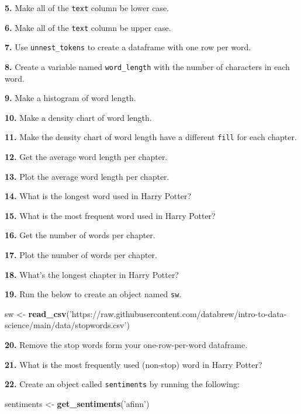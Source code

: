 \documentclass[]{book}
\newenvironment{Shaded}{\begin{snugshade}}{\end{snugshade}}
\newcommand{\KeywordTok}[1]{\textcolor[rgb]{0.13,0.29,0.53}{\textbf{#1}}}
\newcommand{\NormalTok}[1]{#1}
\newcommand{\StringTok}[1]{\textcolor[rgb]{0.31,0.60,0.02}{#1}}
\begin{document}
\textbf{5.} Make all of the \texttt{text} column be lower case.

\textbf{6.} Make all of the \texttt{text} column be upper case.

\textbf{7.} Use \texttt{unnest\_tokens} to create a dataframe with one row per word.

\textbf{8.} Create a variable named \texttt{word\_length} with the number of characters in each word.

\textbf{9.} Make a histogram of word length.

\textbf{10.} Make a density chart of word length.

\textbf{11.} Make the density chart of word length have a different \texttt{fill} for each chapter.

\textbf{12.} Get the average word length per chapter.

\textbf{13.} Plot the average word length per chapter.

\textbf{14.} What is the longest word used in Harry Potter?

\textbf{15.} What is the most frequent word used in Harry Potter?

\textbf{16.} Get the number of words per chapter.

\textbf{17.} Plot the number of words per chapter.

\textbf{18.} What's the longest chapter in Harry Potter?

\textbf{19.} Run the below to create an object named \texttt{sw}.

\begin{Shaded}
\begin{Highlighting}[]
\NormalTok{sw <-}\StringTok{ }\KeywordTok{read_csv}\NormalTok{(}\StringTok{'https://raw.githubusercontent.com/databrew/intro-to-data-science/main/data/stopwords.csv'}\NormalTok{)}
\end{Highlighting}
\end{Shaded}

\textbf{20.} Remove the stop words form your one-row-per-word dataframe.

\textbf{21.} What is the most frequently used (non-stop) word in Harry Potter?

\textbf{22.} Create an object called \texttt{sentiments} by running the following:

\begin{Shaded}
\begin{Highlighting}[]
\NormalTok{sentiments <-}\StringTok{ }\KeywordTok{get_sentiments}\NormalTok{(}\StringTok{'afinn'}\NormalTok{)}
\end{Highlighting}
\end{Shaded}
\end{document}
